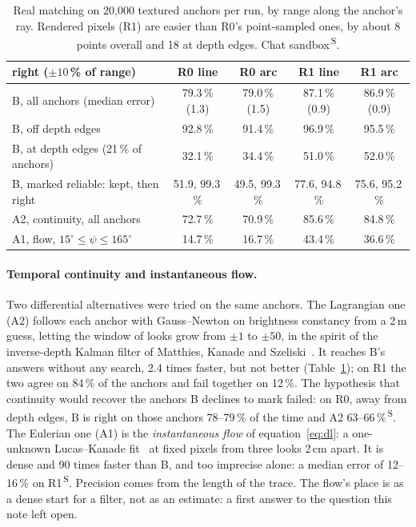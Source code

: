 \documentclass[11pt,a4paper]{article}
\newcommand{\src}[1]{\textsuperscript{\,#1}}
\newcommand{\SB}{\src{S}}   %
\begin{document}
\begin{table}[h]
\centering\footnotesize
\begin{tabular}{@{}lcccc@{}}
\toprule
right ($\pm10$\,\% of range) & R0 line & R0 arc & R1 line & R1 arc\\
\midrule
B, all anchors (median error) & 79.3\,\% (1.3) & 79.0\,\% (1.5) & 87.1\,\% (0.9) & 86.9\,\% (0.9)\\
B, off depth edges & 92.8\,\% & 91.4\,\% & 96.9\,\% & 95.5\,\%\\
B, at depth edges (21\,\% of anchors) & 32.1\,\% & 34.4\,\% & 51.0\,\% & 52.0\,\%\\
B, marked reliable: kept, then right & 51.9, 99.3\,\% & 49.5, 99.3\,\% & 77.6, 94.8\,\% & 75.6, 95.2\,\%\\
A2, continuity, all anchors & 72.7\,\% & 70.9\,\% & 85.6\,\% & 84.8\,\%\\
A1, flow, $15^\circ\le\psi\le165^\circ$ & 14.7\,\% & 16.7\,\% & 43.4\,\% & 36.6\,\%\\
\bottomrule
\end{tabular}
\caption{Real matching on 20{,}000 textured anchors per run, by range along the anchor's ray. Rendered pixels (R1) are
easier than R0's point-sampled ones, by about 8 points overall and 18 at depth edges. Chat sandbox\SB.}\label{tab:matching}
\end{table}

\paragraph{Temporal continuity and instantaneous flow.} Two differential alternatives were tried on the same anchors. The
Lagrangian one (A2) follows each anchor with Gauss--Newton on brightness constancy from a 2\,m guess, letting the window of
looks grow from $\pm1$ to $\pm50$, in the spirit of the inverse-depth Kalman filter of Matthies, Kanade and
Szeliski~\cite{matthies}. It reaches B's answers without any search, 2.4 times faster, but not better (Table~\ref{tab:matching});
on R1 the two agree on 84\,\% of the anchors and fail together on 12\,\%. The hypothesis that continuity would recover
the anchors B declines to mark failed: on R0, away from depth edges, B is right on those anchors 78--79\,\% of the time
and A2 63--66\,\%\SB. The Eulerian one (A1) is the
\emph{instantaneous flow} of equation~\eqref{eq:dl}: a one-unknown Lucas--Kanade fit~\cite{lucaskanade} at fixed pixels from
three looks 2\,cm apart. It is dense and 90 times faster than B, and too imprecise alone: a median error of 12--16\,\% on
R1\SB. Precision comes from the length of the trace. The flow's place is as a dense start for a filter, not as an estimate:
a first answer to the question this note left open.
\end{document}
